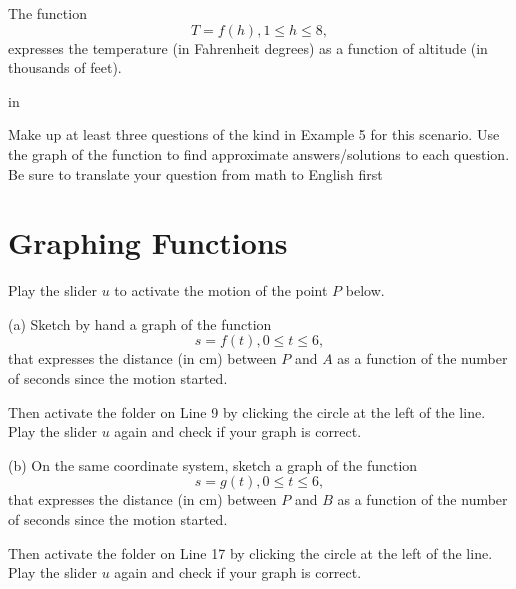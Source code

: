 \documentclass{ximera}
\newcommand{\pskip}{\vskip 0.1 in}
\begin{document}
\begin{example} \label{Ex:Fun6}
The function
\[
   T = f(h) , 1\leq h \leq 8,
\]
expresses the temperature (in Fahrenheit degrees) as a function of altitude (in thousands of feet). 

\pskip

Make up at least three questions of the kind in Example 5 for this scenario. Use the graph of the function to find approximate answers/solutions to each question. Be sure to translate your question from math to English first

\begin{exploration}\label{exp:Fun6}


 
\begin{onlineOnly}
    \begin{center}
\end{center}
\end{onlineOnly}
\end{exploration}

\end{example}





\section{Graphing Functions}

\begin{exploration}\label{exp:Bugs1}
Play the slider $u$ to activate the motion of the point $P$ below.

(a) Sketch by hand a graph of the function 
\[
   s=f(t), 0\leq t \leq 6 ,
\] 
that expresses the distance (in cm) between $P$ and $A$ as a function of the number of seconds since the motion started.

Then activate the folder on Line 9 by clicking the circle at the left of the line. Play the slider $u$ again and check if your graph is correct.

(b) On the same coordinate system, sketch a graph of the function 
\[
   s=g(t), 0\leq t \leq 6 ,
\] 
that expresses the distance (in cm) between $P$ and $B$ as a function of the number of seconds since the motion started.

Then activate the folder on Line 17 by clicking the circle at the left of the line. Play the slider $u$ again and check if your graph is correct.


 
\begin{onlineOnly}
    \begin{center}
\end{center}
\end{onlineOnly}
\end{exploration}
\end{document}
